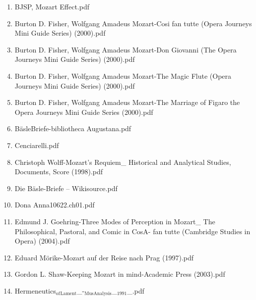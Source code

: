 \documentclass[11pt]{article}
\begin{document}
\begin{enumerate}
\begin{enumerate}
\item BJSP, Mozart Effect.pdf
\label{sec-1-1-1-1-31-7-13-2}

\item Burton D. Fisher, Wolfgang Amadeus Mozart-Cosi fan tutte (Opera Journeys Mini Guide Series) (2000).pdf
\label{sec-1-1-1-1-31-7-13-3}

\item Burton D. Fisher, Wolfgang Amadeus Mozart-Don Giovanni (The Opera Journeys Mini Guide Series) (2000).pdf
\label{sec-1-1-1-1-31-7-13-4}

\item Burton D. Fisher, Wolfgang Amadeus Mozart-The Magic Flute (Opera Journeys Mini Guide Series) (2000).pdf
\label{sec-1-1-1-1-31-7-13-5}

\item Burton D. Fisher, Wolfgang Amadeus Mozart-The Marriage of Figaro the Opera Journeys Mini Guide Series (2000).pdf
\label{sec-1-1-1-1-31-7-13-6}

\item BäsleBriefe-bibliotheca Augustana.pdf
\label{sec-1-1-1-1-31-7-13-7}

\item Cenciarelli.pdf
\label{sec-1-1-1-1-31-7-13-8}

\item Christoph Wolff-Mozart's Requiem\_ Historical and Analytical Studies, Documents, Score (1998).pdf
\label{sec-1-1-1-1-31-7-13-9}

\item Die Bäsle-Briefe – Wikisource.pdf
\label{sec-1-1-1-1-31-7-13-10}

\item Dona Anna10622.ch01.pdf
\label{sec-1-1-1-1-31-7-13-11}

\item Edmund J. Goehring-Three Modes of Perception in Mozart\_ The Philosophical, Pastoral, and Comic in CosA- fan tutte (Cambridge Studies in Opera) (2004).pdf
\label{sec-1-1-1-1-31-7-13-12}

\item Eduard Mörike-Mozart auf der Reise nach Prag (1997).pdf
\label{sec-1-1-1-1-31-7-13-13}

\item Gordon L. Shaw-Keeping Mozart in mind-Academic Press (2003).pdf
\label{sec-1-1-1-1-31-7-13-14}

\item Hermeneutics$_{\text{of}}$$_{\text{Lament}}$\_-$_{\text{MusAnalysis}}$\_$_{\text{1991}}$\_.pdf
\label{sec-1-1-1-1-31-7-13-15}


\end{enumerate}
\end{enumerate}
\end{document}
